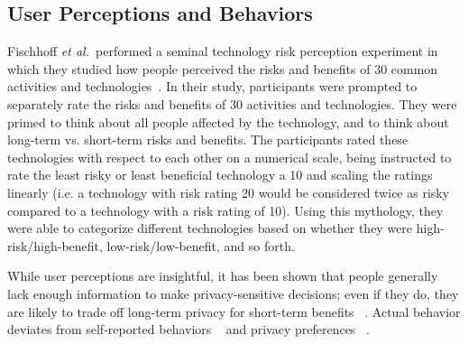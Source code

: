 \documentclass{acm_proc_article-sp}
\def\etal{{\it et al.~}}
\begin{document}

\subsection{User Perceptions and Behaviors}

Fischhoff \etal performed a seminal technology risk perception experiment in which they studied how people perceived the risks and benefits of 30 common activities and technologies~\cite{Fischhoff}. In their study, participants were prompted to separately rate the risks and benefits of 30 activities and technologies. They were primed to think about all people affected by the technology, and to think about long-term vs. short-term risks and benefits. The participants rated these technologies with respect to each other on a numerical scale, being instructed to rate the least risky or least beneficial technology a 10 and scaling the ratings linearly (i.e. a technology with risk rating 20 would be considered twice as risky compared to a technology with a risk rating of 10). Using this mythology, they were able to categorize different technologies based on whether they were high-risk/high-benefit, low-risk/low-benefit, and so forth. 

While user perceptions are insightful, it has been shown that people generally lack enough information to make privacy-sensitive decisions; even if they do, they are likely to trade off long-term privacy for short-term benefits ~\cite{acquisti2005privacy}. Actual behavior deviates from self-reported behaviors ~\cite{jensen2005privacy} and privacy preferences ~\cite{spiekermann2001privacy}. 


\end{document}
